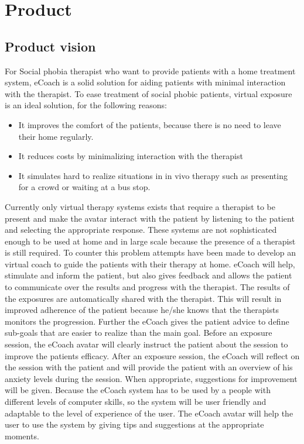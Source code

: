 \chapter{Product}

\section{Product vision}
For Social phobia therapist who want to provide patients with a home treatment system, eCoach is a  solid solution for aiding patients with minimal interaction with the therapist. To ease treatment of social phobic patients, virtual exposure is an ideal solution, for the following reasons:
\begin{itemize}
\item It improves the comfort of the patients, because there is no need to leave their home regularly.
\item It reduces costs by minimalizing interaction with the therapist
\item It simulates hard to realize situations in in vivo therapy such as presenting for a crowd or waiting at a bus stop.
\end{itemize}
Currently only virtual therapy systems exists that require a therapist to be present and make the avatar interact with the patient by listening to the patient and selecting the appropriate response. These systems are not sophisticated enough to be used at home and in large scale because the presence of a therapist is still required. To counter this problem attempts have been made to develop an virtual coach to guide the patients with their therapy at home.
eCoach will help, stimulate and inform the patient, but also gives feedback and allows the patient to communicate over the results and progress with the therapist. The results of the exposures are automatically shared with the therapist. This will result in improved adherence of the patient because he/she knows that the therapists monitors the progression.
Further the eCoach gives the patient advice to define sub-goals that are easier to realize than the main goal. Before an exposure session, the eCoach avatar will clearly instruct the patient about the session to improve the patients efficacy. After an exposure session, the eCoach will reflect on the session with the patient and will provide the patient with an overview of his anxiety levels during the session. When appropriate, suggestions for improvement will be given.
Because the eCoach system has to be used by a people with different levels of computer skills, so the system will be user friendly and adaptable to the level of experience of the user. The eCoach avatar will help the user to use the system by giving tips and suggestions at the appropriate moments.


